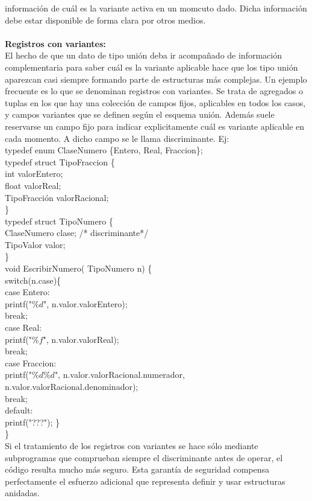 \documentclass[11pt,a4paper]{article}
\begin{document}
    información de cuál es la variante activa en un momcuto dado. Dicha información debe estar disponible de forma clara por otros medios.\\
    \\
    \textbf{Registros con variantes:}\\
    El hecho de que un dato de tipo unión deba ir acompañado de información complementaria para saber cuál es la variante aplicable hace que los tipo
    unión aparezcan casi siempre formando parte de estructuras más complejas. Un ejemplo frecuente es lo que se denominan registros con variantes. Se trata
    de agregados o tuplas en los que hay una colección de campos fijos, aplicables en todos los casos, y campos variantes que se definen según el esquema unión.
    Además suele reservarse un campo fijo para indicar explicitamente cuál es variante aplicable en cada momento. A dicho campo se le llama discriminante. Ej:\\
    typedef enum ClaseNumero \{Entero, Real, Fraccion\};\\
    typedef struct TipoFraccion \{ \\
    int valorEntero;\\
    float valorReal;\\
    TipoFracción valorRacional;\\
    \}\\
    typedef struct TipoNumero \{ \\
    ClaseNumero clase; /* discriminante*/ \\
    TipoValor valor;\\
    \}\\
    void EscribirNumero( TipoNumero n) \{
    \\ 
    switch(n.case)\{ \\
    case Entero:\\
    printf("$\%d$", n.valor.valorEntero);\\
    break;\\
    case Real:\\
    printf("$\%f$", n.valor.valorReal);\\
    break;\\
    case Fraccion:\\
    printf("$\%d\%d$", n.valor.valorRacional.numerador, n.valor.valorRacional.denominador);\\
    break;\\
    default:\\
    printf("???");
    \} \\
    \} \\
  Si el tratamiento de los registros con variantes se hace sólo mediante subprogramas que comprueban siempre el discriminante antes de operar, el código resulta mucho más seguro. Esta garantía de seguridad compensa perfectamente el esfuerzo adicional que representa definir y usar estructuras anidadas.
\end{document}
